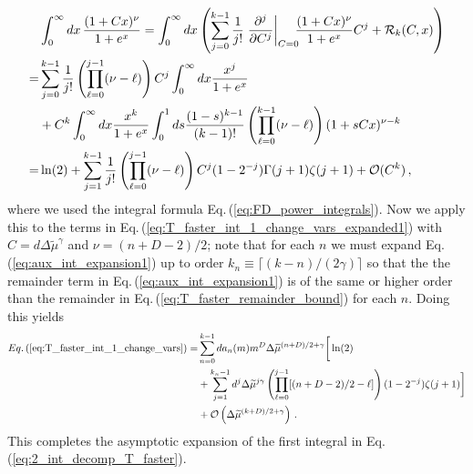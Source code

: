 \documentclass[sn-mathphys,Numbered]{sn-jnl}
\newcommand{\req}[1]{Eq.\,(\ref{#1})}
\begin{document}
\begin{align}\label{eq:aux_int_expansion1}
&\int_0^\infty dx\, \frac{(1+C x)^\nu}{1+e^x} = \int_0^\infty dx\left(\sum_{j=0}^{k-1} \frac{1}{j!} \left.\frac{\partial^j}{\partial C^j}\right|_{C=0}\!\!\! \frac{(1+Cx)^\nu}{1 + e^x} C^j + \mathcal{R}_k(C,x)\right)\\
=&\sum_{j=0}^{k-1}\frac{1}{j!} \left(\prod_{\ell=0}^{j-1}(\nu-\ell) \right)C^j\int_0^\infty dx\frac{x^j}{1+e^x} \notag\\
&+C^k\int_0^\infty dx \frac{x^k}{1+e^x} \int_0^1 ds\frac{(1-s)^{k-1}}{(k-1)!} \left(\prod_{\ell=0}^{k-1}(\nu-\ell)\right)(1+sCx)^{\nu-k}\notag\\
=&\ln(2)+\sum_{j=1}^{k-1}\frac{1}{j!} \left(\prod_{\ell=0}^{j-1}(\nu-\ell) \right)C^j (1 - 2^{-j}) \Gamma(j+1) \zeta(j+1) +\mathcal{O}(C^k)\,, \notag
\end{align}
where we used the integral formula \req{eq:FD_power_integrals}. Now we apply this to the terms in \req{eq:T_faster_int_1_change_vars_expanded1} with $C=d\Delta\widetilde{\mu}^\gamma$ and $\nu=(n+D-2)/2$; note that for each $n$ we must expand \req{eq:aux_int_expansion1} up to order $k_n\equiv\lceil(k-n)/(2\gamma)\rceil$ so that the the remainder term in \req{eq:aux_int_expansion1} is of the same or higher order than the remainder in \req{eq:T_faster_remainder_bound} for each $n$. Doing this yields
\begin{align}\label{eq:T_faster_int_1_change_vars_expanded2}
\req{eq:T_faster_int_1_change_vars} =& \sum_{n=0}^{k-1} da_n(m)m^{D}\Delta\widetilde{\mu}^{(n+D)/2+\gamma}\bigg[
\ln(2)\\
&+\sum_{j=1}^{k_n-1}d^j\Delta\widetilde{\mu}^{j\gamma} \left(\prod_{\ell=0}^{j-1}[(n+D-2)/2-\ell] \right) (1 - 2^{-j}) \zeta(j+1)\bigg]\notag
\\
&+\mathcal{O}\left(\Delta\widetilde{\mu}^{(k+D)/2+\gamma}\right)\,.\notag
\end{align}
This completes the asymptotic expansion of the first integral in \req{eq:2_int_decomp_T_faster}.
\end{document}
